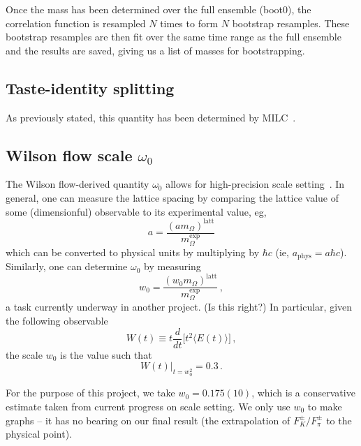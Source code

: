 \documentclass[prd,tightenlines,preprintnumbers,showpacs,superscriptaddress,notitlepage,eqsecnum,floatfix,notitlepage]{revtex4-1}
\begin{document}
Once the mass has been determined over the full ensemble (boot0), the correlation function is resampled $N$ times to form $N$ bootstrap resamples. These bootstrap resamples are then fit over the same time range as the full ensemble and the results are saved, giving us a list of masses for bootstrapping.

\subsection{Taste-identity splitting}
As previously stated, this quantity has been determined by MILC~\cite{Bazavov:2012xda}.

\subsection{Wilson flow scale $\omega_0$}
The Wilson flow-derived quantity $\omega_0$ allows for high-precision scale setting~\cite{Borsanyi:2012zs}. In general, one can measure the lattice spacing by comparing the lattice value of some (dimensionful) observable to its experimental value, eg,
\begin{equation}
a = \frac{(a m_\Omega)^\text{latt}}{m_\Omega^\text{exp}}
\end{equation}
which can be converted to physical units by multiplying by $\hbar c$ (ie, $a_\text{phys} = a \hbar c$). Similarly, one can determine $\omega_0$ by measuring
\begin{equation}
w_0 = \frac{(w_0 m_\Omega)^\text{latt}}{m_\Omega^\text{exp}} \, ,
\end{equation}
a task currently underway in another project.  {\color{red} (Is this right?)} In particular, given the following observable
\begin{equation}
W(t) \equiv t \frac{d}{dt} \Big[ t^2 \langle E(t) \rangle \Big] \, ,
\end{equation}
the scale $w_0$ is the value such that
\begin{equation}
W(t) \Big|_{t=w_0^2} = 0.3 \, .
\end{equation}

For the purpose of this project, we take $w_0 = 0.175(10)$, which is a conservative estimate taken from current progress on scale setting. We only use $w_0$ to make graphs -- it has no bearing on our final result (the extrapolation of $F^\pm_K/F^\pm_\pi$ to the physical point).
\end{document}
